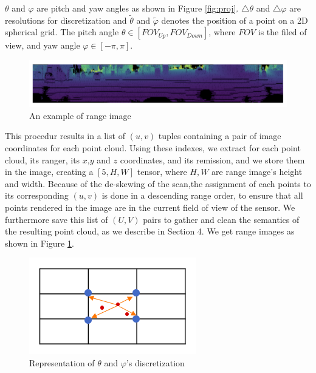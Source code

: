 \documentclass[final]{cvpr}
\begin{document}
$\theta$ and $\varphi$ are pitch and yaw angles as shown in Figure \ref{fig:proj}. $\triangle \theta$ and $\triangle \varphi$ are resolutions for discretization and $\tilde{\theta}$ and $\tilde{\varphi}$ denotes the position of a point on a 2D spherical grid.  The pitch angle $\theta \in [FOV_{Up}, FOV_{Down}]$, where $FOV$ is the filed of view, and yaw angle $\varphi \in [-\pi, \pi]$.
\begin{figure}[b]
\begin{center}
   \includegraphics[width=1\linewidth]{projex.png}
\end{center}
   \caption{An example of range image}
\label{fig:projex}
\end{figure}
This procedur results in a list of $(u,v)$ tuples containing a pair of image coordinates for each point cloud. Using these  indexes, we extract for each point cloud, its ranger, its $x$,$y$ and $z$ coordinates, and its remission, and we store them in the image, creating a $[5,H,W]$ tensor, where $H,W$ are range image's height and width. Because of the de-skewing of the scan,the assignment of each points to its corresponding $(u,v)$ is done in a descending range order, to ensure that all points rendered in the image are in the current field of view of the sensor. We furthermore save this list of $(U,V)$ pairs to gather and clean the semantics of the resulting point cloud, as we describe in Section 4. We get range images as shown in Figure \ref{fig:projex}.



\begin{figure}[htbp]
\begin{center}
   \includegraphics[width=0.6\linewidth]{latex/round.png}
\end{center}
   \caption{Representation of $\theta$ and $\varphi$'s discretization}
\label{fig:qua}
\end{figure}
\end{document}
